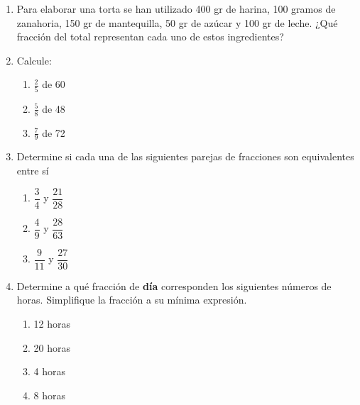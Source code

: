 \documentclass[fleqn]{article}
\begin{document}
\begin{enumerate}
 \item Para elaborar una torta se han utilizado 400 gr de harina, 100 gramos de zanahoria, 150 gr de mantequilla, 50 gr de azúcar y 100 gr de leche. ¿Qué fracción del total representan cada uno de estos ingredientes?\noanswer
  \newpage
 \item Calcule:
 \begin{enumerate}
 \item $\frac{2}{5}$ de 60 \noanswer
 \item $\frac{5}{8}$ de 48 \noanswer
 \item $\frac{7}{9}$ de 72 \noanswer
 \end{enumerate}
 \item Determine si cada una de las siguientes parejas de fracciones son equivalentes entre sí
 \begin{enumerate}
 \item $\dfrac{3}{4}$ y $\dfrac{21}{28}$ \noanswer
 \item $\dfrac{4}{9}$ y $\dfrac{28}{63}$ \noanswer
 \item $\dfrac{9}{11}$ y $\dfrac{27}{30}$ \noanswer
 \end{enumerate}
 \item Determine a qué fracción de \textbf{día} corresponden los siguientes números de horas. Simplifique la fracción a su mínima expresión.
 \begin{enumerate}
 \item 12 horas \noanswer
 \item 20 horas \noanswer
  \item 4 horas \noanswer
 \item 8 horas \noanswer
 \end{enumerate}
 \end{enumerate}
\end{document}
